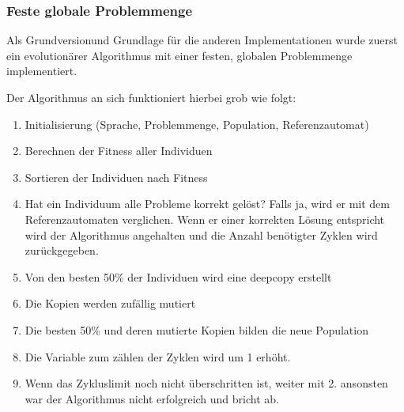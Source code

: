 \subsubsection{Feste globale Problemmenge}
Als \flqq Grundversion\frqq und Grundlage für die anderen Implementationen wurde zuerst ein evolutionärer Algorithmus mit einer festen, globalen Problemmenge implementiert.

Der Algorithmus an sich funktioniert hierbei grob wie folgt: 
\begin{enumerate}
\item Initialisierung (Sprache, Problemmenge, Population, Referenzautomat)
\item Berechnen der Fitness aller Individuen
\item Sortieren der Individuen nach Fitness
\item Hat ein Individuum alle Probleme korrekt gelöst? Falls ja, wird er mit dem Referenzautomaten verglichen. Wenn er einer korrekten Lösung entspricht wird der Algorithmus angehalten und die Anzahl benötigter Zyklen wird zurückgegeben.
\item Von den besten 50\% der Individuen wird eine \Gls{deepcopy} erstellt
\item Die Kopien werden zufällig mutiert
\item Die besten 50\% und deren mutierte Kopien bilden die neue Population
\item Die Variable zum zählen der Zyklen wird um 1 erhöht.
\item Wenn das Zykluslimit noch nicht überschritten ist, weiter mit 2. ansonsten war der Algorithmus nicht erfolgreich und bricht ab.
\end{enumerate}
